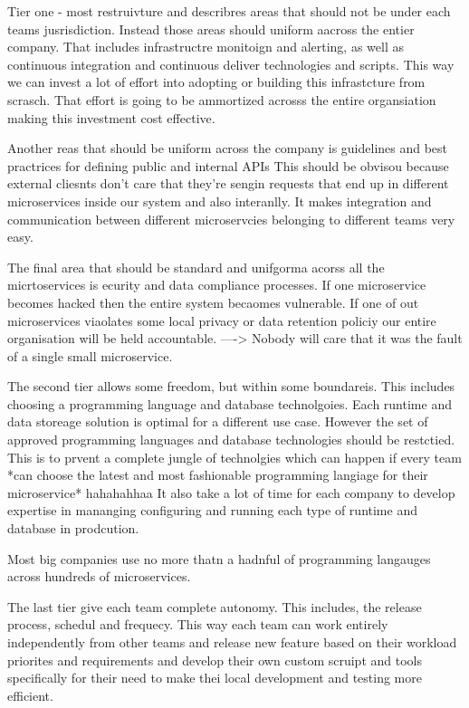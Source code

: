 \documentclass[a4paper, 11pt]{book}
\begin{document}
    Tier one - most restruivture and describres areas that should not be under each teams jusrisdiction.
    Instead those areas should uniform aacross the entier company.
    That includes infrastructre monitoign and alerting, as well as continuous integration and continuous deliver technologies and scripts.
    This way we can invest a lot of effort into adopting or building this infrastcture from scrasch.
    That effort is going to be ammortized acrosss the entire organsiation making this investment cost effective.

    Another reas that should be uniform across the company is guidelines and best practrices for defining public and internal APIs
    This should be obvisou because external cliesnts don't care that they're sengin requests that end up in different microservices inside our system and also interanlly.
    It makes integration and communication between different microservcies belonging to different teams very easy.

    The final area that should be standard and unifgorma acorss all the micrtoservices is ecurity and data compliance processes.
    If one microservice becomes hacked then the entire system becaomes vulnerable. If one of out microservices viaolates some local privacy or data retention policiy our entire organisation will be held accountable.
    ----> Nobody will care that it was the fault of a single small microservice.

    The second tier allows some freedom, but within some boundareis.
    This includes choosing a programming language and database technolgoies.
    Each runtime and data storeage solution is optimal for a different use case.
    However the set of approved programming languages and database technologies should be restctied.
    This is to prvent a complete jungle of technolgies which can happen if every team *can choose the latest and most fashionable programming langiage for their microservice* hahahahhaa
    It also take a lot of time for each company to develop expertise in mananging configuring and running each type of runtime and database in prodcution.

    Most big companies use no more thatn a hadnful of programming langauges across hundreds of microservices.

    The last tier give each team complete autonomy.
    This includes, the release process, schedul and frequecy.
    This way each team can work entirely independently from other teams and release new feature based on their workload priorites and requirements and develop their own custom scruipt and tools specifically for their need to make thei local development and testing more efficient.
\end{document}
